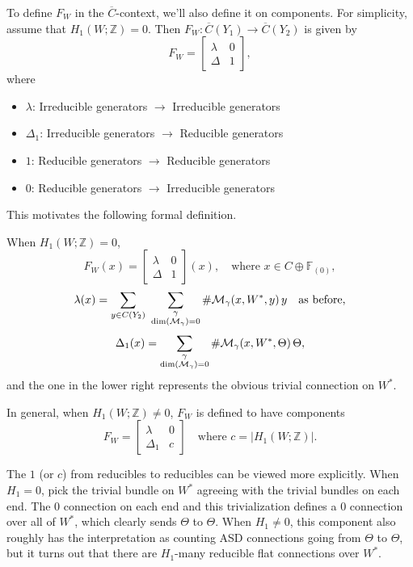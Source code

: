 \documentclass[main]{subfiles}
\begin{document}
To define $F_W$ in the $\overline{C}$-context, we'll also define it on components. For simplicity, assume that $H_1(W;\mathbb{Z})=0$. Then $F_W : \overline{C}(Y_1)\to\overline{C}(Y_2)$ is given by
\[
F_W = \begin{bmatrix}\lambda & 0\\ \Delta & 1\end{bmatrix},
\]
where
\begin{itemize}
\item[] $\lambda$: Irreducible generators $\to$ Irreducible generators
\item[] $\Delta_1$: Irreducible generators $\to$ Reducible generators
\item[] $1$: Reducible generators $\to$ Reducible generators
\item[] $0$: Reducible generators $\to$ Irreducible generators
\end{itemize}
This motivates the following formal definition.

\begin{definition}
When $H_1(W;\mathbb{Z})=0$,
\[
F_W(x) = \begin{bmatrix}\lambda & 0\\ \Delta & 1\end{bmatrix}(x), \quad \text{where } x\in C\oplus\mathbb{F}_{(0)},
\]
\[
\lambda(x) = \sum_{y\in C(Y_2)}\ \sum_{\substack{\gamma \\ \dim(\mc{M}_\gamma)=0}} \#\mc{M}_\gamma(x,W^\ast,y)\, y \quad \text{as before,}
\]
\[
\Delta_1(x) = \sum_{\substack{\gamma \\ \dim(\mathcal{M}_\gamma)=0}} \#\mathcal{M}_\gamma(x,W^\ast,\Theta)\,\Theta,
\]
and the one in the lower right represents the obvious trivial connection on $W^\ast$.

In general, when $H_1(W;\mathbb{Z})\neq 0$, $F_W$ is defined to have components
\[
F_W = \begin{bmatrix}\lambda & 0\\ \Delta_1 & c\end{bmatrix} \quad \text{where } c = |H_1(W;\mathbb{Z})|.
\]
\end{definition}

The $1$ (or $c$) from reducibles to reducibles can be viewed more explicitly. When $H_1=0$, pick the trivial bundle on $W^\ast$ agreeing with the trivial bundles on each end. The $0$ connection on each end and this trivialization defines a $0$ connection over all of $W^\ast$, which clearly sends $\Theta$ to $\Theta$. When $H_1\neq 0$, this component also roughly has the interpretation as counting ASD connections going from $\Theta$ to $\Theta$, but it turns out that there are $H_1$-many reducible flat connections over $W^\ast$.
\end{document}
